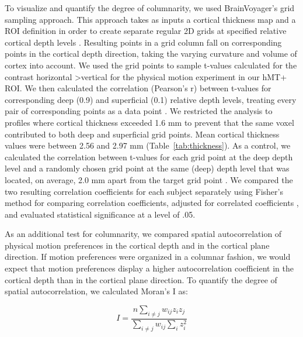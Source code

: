 To visualize and quantify the degree of columnarity, we used BrainVoyager's grid sampling approach. This approach takes as inputs a cortical thickness map and a ROI definition in order to create separate regular 2D grids at specified relative cortical depth levels \parencite{Zimmermann2011,Kemper2017}. Resulting points in a grid column fall on corresponding points in the cortical depth direction, taking the varying curvature and volume of cortex into account. We used the grid points to sample t-values calculated for the contrast horizontal \textgreater vertical for the physical motion experiment in our hMT+ ROI. We then calculated the correlation (Pearson's r) between t-values for corresponding deep (0.9) and superficial (0.1) relative depth levels, treating every pair of corresponding points as a data point \parencite{Nasr2016}. We restricted the analysis to profiles where cortical thickness exceeded 1.6 mm to prevent that the same voxel contributed to both deep and superficial grid points. Mean cortical thickness values were between 2.56 and 2.97 mm (Table~\ref{tab:thickness}). As a control, we calculated the correlation between t-values for each grid point at the deep depth level and a randomly chosen grid point at the same (deep) depth level that was located, on average, 2.0 mm apart from the target grid point \parencite{Nasr2016}. We compared the two resulting correlation coefficients for each subject separately using Fisher’s method for comparing correlation coefficients, adjusted for correlated coefficients \parencite{Meng1992}, and evaluated statistical significance at a level of .05.

As an additional test for columnarity, we compared spatial autocorrelation of physical motion preferences in the cortical depth and in the cortical plane direction. If motion preferences were organized in a columnar fashion, we would expect that motion preferences display a higher autocorrelation coefficient in the cortical depth than in the cortical plane direction. To quantify the degree of spatial autocorrelation, we calculated Moran’s I \parencite{Moran1950, Rosenberg2010} as:

\begin{equation}
I = \frac{n \sum\limits_{i \neq j} w_{ij} z_i z_j}{\sum\limits_{i \neq j} w_{ij} \sum\limits_{i} z_i^2}
\end{equation}

